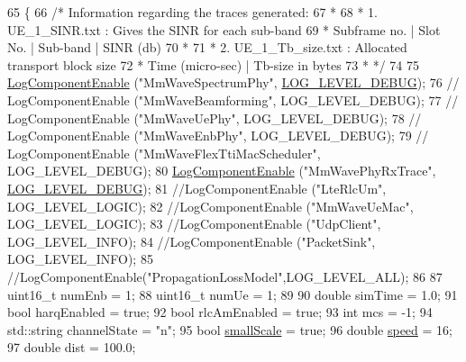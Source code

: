 \begin{DoxyCode}
65 \{
66   \textcolor{comment}{/* Information regarding the traces generated:}
67 \textcolor{comment}{   *}
68 \textcolor{comment}{   * 1. UE\_1\_SINR.txt : Gives the SINR for each sub-band}
69 \textcolor{comment}{   *    Subframe no.  | Slot No. | Sub-band  | SINR (db)}
70 \textcolor{comment}{   *}
71 \textcolor{comment}{   * 2. UE\_1\_Tb\_size.txt : Allocated transport block size}
72 \textcolor{comment}{   *    Time (micro-sec)  |  Tb-size in bytes}
73 \textcolor{comment}{   * */}
74 
75         \hyperlink{namespacens3_adc4ef4f00bb2f5f4edae67fc3bc27f20}{LogComponentEnable} (\textcolor{stringliteral}{"MmWaveSpectrumPhy"}, 
      \hyperlink{namespacens3_aa6464a4d69551a9cc968e17a65f39bdbabc85ae851e992c4d8577705c712061ef}{LOG\_LEVEL\_DEBUG});
76 \textcolor{comment}{//      LogComponentEnable ("MmWaveBeamforming", LOG\_LEVEL\_DEBUG);}
77 \textcolor{comment}{//      LogComponentEnable ("MmWaveUePhy", LOG\_LEVEL\_DEBUG);}
78 \textcolor{comment}{//      LogComponentEnable ("MmWaveEnbPhy", LOG\_LEVEL\_DEBUG);}
79 \textcolor{comment}{//      LogComponentEnable ("MmWaveFlexTtiMacScheduler", LOG\_LEVEL\_DEBUG);}
80         \hyperlink{namespacens3_adc4ef4f00bb2f5f4edae67fc3bc27f20}{LogComponentEnable} (\textcolor{stringliteral}{"MmWavePhyRxTrace"}, 
      \hyperlink{namespacens3_aa6464a4d69551a9cc968e17a65f39bdbabc85ae851e992c4d8577705c712061ef}{LOG\_LEVEL\_DEBUG});
81         \textcolor{comment}{//LogComponentEnable ("LteRlcUm", LOG\_LEVEL\_LOGIC);}
82         \textcolor{comment}{//LogComponentEnable ("MmWaveUeMac", LOG\_LEVEL\_LOGIC);}
83         \textcolor{comment}{//LogComponentEnable ("UdpClient", LOG\_LEVEL\_INFO);}
84         \textcolor{comment}{//LogComponentEnable ("PacketSink", LOG\_LEVEL\_INFO);}
85         \textcolor{comment}{//LogComponentEnable("PropagationLossModel",LOG\_LEVEL\_ALL);}
86 
87         uint16\_t numEnb = 1;
88         uint16\_t numUe = 1;
89 
90         \textcolor{keywordtype}{double} simTime = 1.0;
91         \textcolor{keywordtype}{bool} harqEnabled = \textcolor{keyword}{true};
92         \textcolor{keywordtype}{bool} rlcAmEnabled = \textcolor{keyword}{true};
93         \textcolor{keywordtype}{int} mcs = -1;
94         std::string channelState = \textcolor{stringliteral}{"n"};
95         \textcolor{keywordtype}{bool} \hyperlink{mmwave-amc-test_8cc_a204169f2af2a5f81da1189ea236307c8}{smallScale} = \textcolor{keyword}{true};
96         \textcolor{keywordtype}{double} \hyperlink{mmwave-amc-test_8cc_a6dc6e6f3c75c509ce943163afb5dade7}{speed} = 16;
97         \textcolor{keywordtype}{double} dist = 100.0;

\end{DoxyCode}
